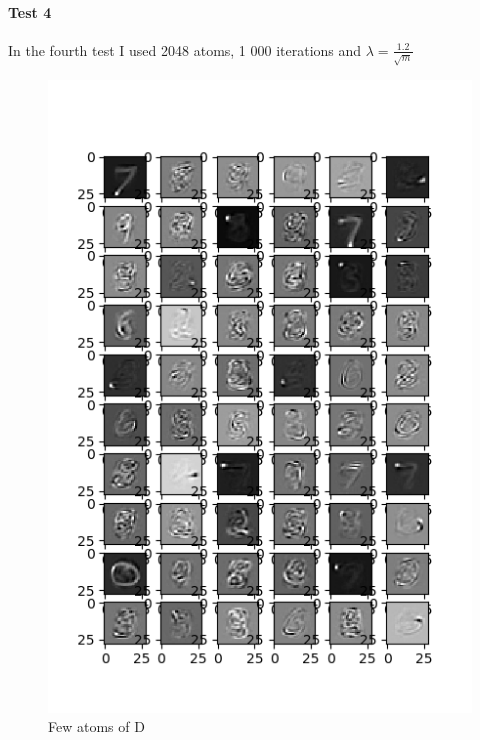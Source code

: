 \documentclass[a4paper,10pt]{article}
\begin{document}
\paragraph{Test 4} In the fourth test I used 2048 atoms, 1 000 iterations and $\lambda = \frac{1.2}{\sqrt{m}}$
\begin{figure}[h]
 \centering
 \includegraphics[scale=0.82]{Results/SPAMS_X_ALL_K_2048/D_K2048.png}
 \caption{Few atoms of D}
 \end{figure}
 
\end{document}
